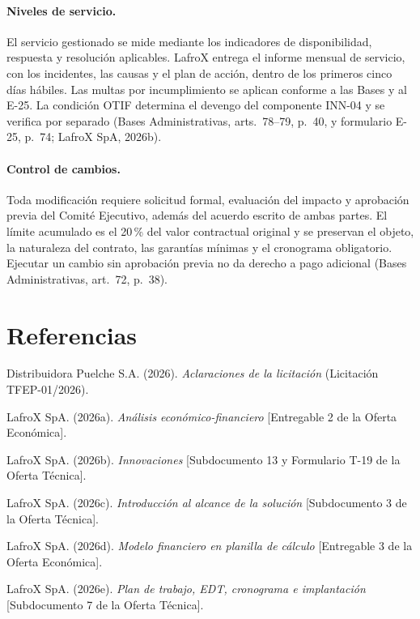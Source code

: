 \paragraph{Niveles de servicio.} El servicio gestionado se mide mediante los indicadores de disponibilidad, respuesta y resolución aplicables. LafroX entrega el informe mensual de servicio, con los incidentes, las causas y el plan de acción, dentro de los primeros cinco días hábiles. Las multas por incumplimiento se aplican conforme a las Bases y al E-25. La condición OTIF determina el devengo del componente INN-04 y se verifica por separado (Bases Administrativas, arts.~78--79, p.~40, y formulario E-25, p.~74; LafroX SpA, 2026b).

\paragraph{Control de cambios.} Toda modificación requiere solicitud formal, evaluación del impacto y aprobación previa del Comité Ejecutivo, además del acuerdo escrito de ambas partes. El límite acumulado es el 20\,\% del valor contractual original y se preservan el objeto, la naturaleza del contrato, las garantías mínimas y el cronograma obligatorio. Ejecutar un cambio sin aprobación previa no da derecho a pago adicional (Bases Administrativas, art.~72, p.~38).

\section*{Referencias}
{}

\noindent Distribuidora Puelche S.A. (2026). \textit{Aclaraciones de la licitación} (Licitación TFEP-01/2026).

\noindent LafroX SpA. (2026a). \textit{Análisis económico-financiero} [Entregable 2 de la Oferta Económica].

\noindent LafroX SpA. (2026b). \textit{Innovaciones} [Subdocumento 13 y Formulario T-19 de la Oferta Técnica].

\noindent LafroX SpA. (2026c). \textit{Introducción al alcance de la solución} [Subdocumento 3 de la Oferta Técnica].

\noindent LafroX SpA. (2026d). \textit{Modelo financiero en planilla de cálculo} [Entregable 3 de la Oferta Económica].

\noindent LafroX SpA. (2026e). \textit{Plan de trabajo, EDT, cronograma e implantación} [Subdocumento 7 de la Oferta Técnica].

